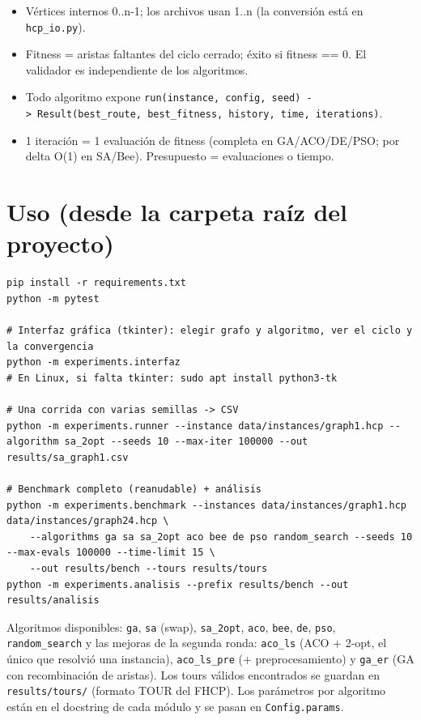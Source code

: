 \documentclass[
  spanish,
  11pt,
]{article}
\providecommand{\tightlist}{%
  \setlength{\itemsep}{0pt}\setlength{\parskip}{0pt}}
\begin{document}
\begin{itemize}
\tightlist
\item
  Vértices internos 0..n-1; los archivos usan 1..n (la conversión está
  en \texttt{hcp\_io.py}).
\item
  Fitness = aristas faltantes del ciclo cerrado; éxito si fitness == 0.
  El validador es independiente de los algoritmos.
\item
  Todo algoritmo expone
  \texttt{run(instance,\ config,\ seed)\ -\textgreater{}\ Result(best\_route,\ best\_fitness,\ history,\ time,\ iterations)}.
\item
  1 iteración = 1 evaluación de fitness (completa en GA/ACO/DE/PSO; por
  delta O(1) en SA/Bee). Presupuesto = evaluaciones o tiempo.
\end{itemize}

\section{Uso (desde la carpeta raíz del
proyecto)}\label{uso-desde-la-carpeta-rauxedz-del-proyecto}

\begin{verbatim}
pip install -r requirements.txt
python -m pytest

# Interfaz gráfica (tkinter): elegir grafo y algoritmo, ver el ciclo y la convergencia
python -m experiments.interfaz
# En Linux, si falta tkinter: sudo apt install python3-tk

# Una corrida con varias semillas -> CSV
python -m experiments.runner --instance data/instances/graph1.hcp --algorithm sa_2opt --seeds 10 --max-iter 100000 --out results/sa_graph1.csv

# Benchmark completo (reanudable) + análisis
python -m experiments.benchmark --instances data/instances/graph1.hcp data/instances/graph24.hcp \
    --algorithms ga sa sa_2opt aco bee de pso random_search --seeds 10 --max-evals 100000 --time-limit 15 \
    --out results/bench --tours results/tours
python -m experiments.analisis --prefix results/bench --out results/analisis
\end{verbatim}

Algoritmos disponibles: \texttt{ga}, \texttt{sa} (swap),
\texttt{sa\_2opt}, \texttt{aco}, \texttt{bee}, \texttt{de},
\texttt{pso}, \texttt{random\_search} y las mejoras de la segunda ronda:
\texttt{aco\_ls} (ACO + 2-opt, el único que resolvió una instancia),
\texttt{aco\_ls\_pre} (+ preprocesamiento) y \texttt{ga\_er} (GA con
recombinación de aristas). Los tours válidos encontrados se guardan en
\texttt{results/tours/} (formato TOUR del FHCP). Los parámetros por
algoritmo están en el docstring de cada módulo y se pasan en
\texttt{Config.params}.
\end{document}
